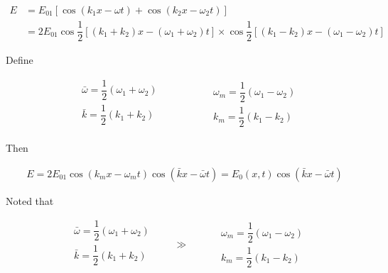 \begin{equation*}
  \begin{aligned}
    E &= E_{01} \left[ \cos \left( k_1 x - \omega t \right) + \cos \left( k_2 x - \omega_2 t \right) \right] \\
    &= 2 E_{01} \cos \dfrac{1}{2} \left[ \left( k_1 + k_2 \right) x - \left( \omega_1 + \omega_2 \right) t \right] \times \cos \dfrac{1}{2} \left[ \left( k_1 - k_2 \right) x - \left( \omega_1 - \omega_2 \right) t \right]  
  \end{aligned}
\end{equation*}

Define

\begin{equation*}
  \begin{aligned}
    & \bar{\omega} = \dfrac{1}{2} \left( \omega_1 + \omega_2 \right) \\ 
    & \bar{k} = \dfrac{1}{2} \left( k_1 + k_2 \right) \\
  \end{aligned}
  \quad\quad\quad\quad
  \begin{aligned}
      & \omega_m = \dfrac{1}{2} \left( \omega_1 - \omega_2 \right) \\ 
      & k_m = \dfrac{1}{2} \left( k_1 - k_2 \right) 
  \end{aligned}
\end{equation*}

Then

\begin{equation*}
  \begin{aligned}
    E = 2 E_{01} \cos \left( k_m x - \omega_m t \right) \cos \left( \bar{k} x - \bar{\omega} t \right) = E_0 \left( x , t \right) \cos \left( \bar{k} x - \bar{\omega} t \right)
  \end{aligned}
\end{equation*}

Noted that

\begin{equation*}
  \begin{aligned}
    & \bar{\omega} = \dfrac{1}{2} \left( \omega_1 + \omega_2 \right) \\ 
    & \bar{k} = \dfrac{1}{2} \left( k_1 + k_2 \right) \\
  \end{aligned}
  \quad\quad \gg \quad\quad
  \begin{aligned}
      & \omega_m = \dfrac{1}{2} \left( \omega_1 - \omega_2 \right) \\ 
      & k_m = \dfrac{1}{2} \left( k_1 - k_2 \right) 
  \end{aligned}
\end{equation*}

